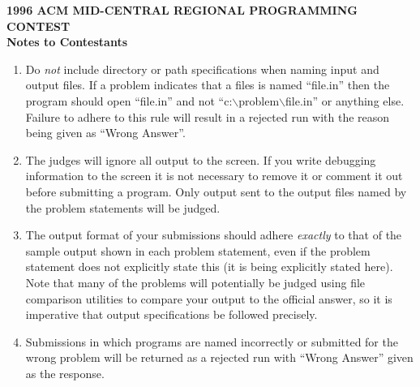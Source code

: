 


\thispagestyle{empty}

\begin{center}
\large\bf 1996 ACM MID-CENTRAL REGIONAL PROGRAMMING CONTEST\\[\bigskipamount]
\Large\bf Notes to Contestants
\end{center}

\bigskip\bigskip\bigskip

\begin{enumerate}

\item Do {\em not\/} include directory or path specifications when
naming input and output files.  If a problem indicates that a files is
named ``file.in'' then the program should open ``file.in'' and not
``c:$\backslash$problem$\backslash$file.in'' or anything else.
Failure to adhere to this rule will result in a rejected run with the
reason being given as ``Wrong Answer''.

\item The judges will ignore all output to the screen.  If you write
debugging information to the screen it is not necessary to remove it
or comment it out before submitting a program.  Only output sent to
the output files named by the problem statements will be judged.

\item The output format of your submissions should adhere {\em
exactly\/} to that of the sample output shown in each problem
statement, even if the problem statement does not explicitly state
this (it is being explicitly stated here).  Note that many of the
problems will potentially be judged using file comparison utilities to
compare your output to the official answer, so it is imperative that
output specifications be followed precisely.

\item Submissions in which programs are named incorrectly or submitted
for the wrong problem will be returned as a rejected run with ``Wrong
Answer'' given as the response.

\end{enumerate}


